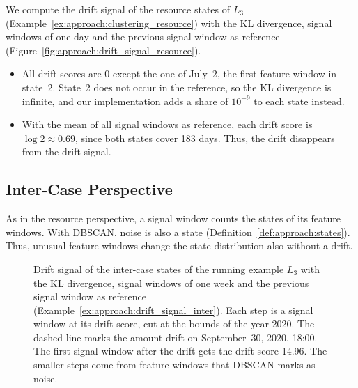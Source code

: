 \begin{example}
	\label{ex:approach:drift_signal_resource}
	We compute the drift signal of the resource states of $L_3$ (Example~\ref{ex:approach:clustering_resource}) with the KL divergence, signal windows of one day and the previous signal window as reference (Figure~\ref{fig:approach:drift_signal_resource}).
	\begin{itemize}
		\item All drift scores are 0 except the one of July~2, the first feature window in state~2. State~2 does not occur in the reference, so the KL divergence is infinite, and our implementation adds a share of $10^{-9}$ to each state instead.

		\item With the mean of all signal windows as reference, each drift score is $\log 2 \approx 0.69$, since both states cover 183 days. Thus, the drift disappears from the drift signal.
	\end{itemize}
\end{example}

\subsection{Inter-Case Perspective}
\label{sec:approach:drift_signals:inter}
As in the resource perspective, a signal window counts the states of its feature windows. With DBSCAN, noise is also a state (Definition~\ref{def:approach:states}). Thus, unusual feature windows change the state distribution also without a drift.

\begin{figure}[tb]
	\centering
	
	\caption[Inter-case drift signal of the running example]{%
		Drift signal of the inter-case states of the running example $L_3$ with the KL divergence, signal windows of one week and the previous signal window as reference (Example~\ref{ex:approach:drift_signal_inter}). Each step is a signal window at its drift score, cut at the bounds of the year 2020. The dashed line marks the amount drift on September~30, 2020, 18:00. The first signal window after the drift gets the drift score 14.96. The smaller steps come from feature windows that DBSCAN marks as noise.}
	\label{fig:approach:drift_signal_inter}
\end{figure}

